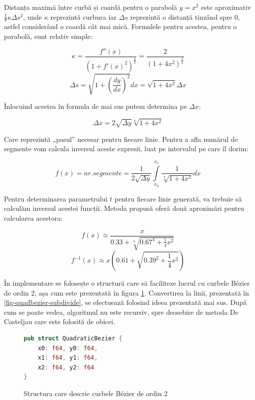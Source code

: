 \documentclass[a4paper, 12pt]{report}
\begin{document}
Distanța maximă între curbă și coardă pentru o parabolă \(y = x^2\) este aproximativ \(\frac{1}{8} \kappa \Delta s^2\),
unde \(\kappa\) reprezintă curbura iar \(\Delta s\) reprezintă o distanță tinzând spre 0, astfel considerând o coardă cât mai mică.
Formulele pentru acestea, pentru o parabolă, sunt relativ simple:

\[
    \kappa = \frac{f''(x)}{\left(1 + f'(x)^2\right)^{\frac{3}{2}}} = \frac{2}{\left(1 + 4x^2\right)^{\frac{3}{2}}}
\]
\[
    \Delta s = \sqrt{1 + \left(\frac{dy}{dx}\right)^2} dx = \sqrt{1 + 4x^2} \Delta x
\]

Înlocuind acestea în formula de mai sus putem determina pe \(\Delta x\):

\[ \Delta x = 2 \sqrt{\Delta y} \sqrt[4]{1 + 4 x^2} \]

Care reprezintă „pasul” necesar pentru fiecare linie. Pentru a afla numărul de segmente vom calcula inversul aceste expresii,
luat pe intervalul pe care îl dorim:

\[
    f(x) = nr. segmente = \frac{1}{2 \sqrt{\Delta y}} \int\limits_{x_0}^{x_1} \frac{1}{\sqrt[4]{1 + 4x^2}} dx
\]

Pentru determinarea parametrului \(t\) pentru fiecare linie generată, va trebuie să calculăm inversul acestei funcții. Metoda
propusă oferă două aproximări pentru calcularea acestora:

\[
    f(x) \approx \frac{x}{0.33 + \sqrt[4]{0.67^4 + \frac{1}{4} x^2}}
\]
\[
    f^{-1}(x) \approx x \left( 0.61 + \sqrt{0.39^2 + \frac{1}{4} x^2} \right)
\]

În implementare se folosește o structură care să faciliteze lucrul cu curbele Bézier de ordin 2, așa cum este prezentată în
figura \ref{fig-struct-quadbezier}. Convertirea la linii, prezentată în \ref{fig-quadbezier-subdivide}, se efectuează folosind
ideea prezentată mai sus. După cum se poate vedea, algoritmul nu este recursiv, spre deosebire de metoda De Casteljau
care este folosită de obicei.

\begin{figure}[ht]
    \centering
    \begin{lstlisting}[language=Rust]
pub struct QuadraticBezier {
    x0: f64, y0: f64,
    x1: f64, y1: f64,
    x2: f64, y2: f64
}
    \end{lstlisting}
    \caption{Structura care descrie curbele Bézier de ordin 2}
    \label{fig-struct-quadbezier}
\end{figure}
\end{document}

